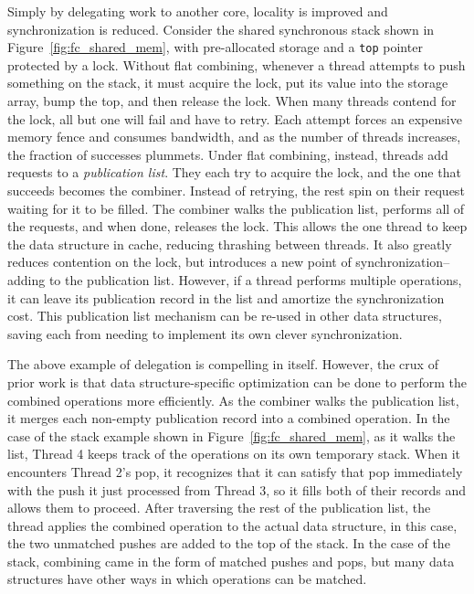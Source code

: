 

Simply by delegating work to another core, locality is improved and synchronization is reduced.
Consider the shared synchronous stack shown in Figure~\ref{fig:fc_shared_mem}, with pre-allocated storage and a \texttt{top} pointer protected by a lock. Without flat combining, whenever a thread attempts to push something on the stack, it must acquire the lock, put its value into the storage array, bump the top, and then release the lock. When many threads contend for the lock, all but one will fail and have to retry. Each attempt forces an expensive memory fence and consumes bandwidth, and as the number of threads increases, the fraction of successes plummets. Under flat combining, instead, threads add requests to a \emph{publication list}. They each try to acquire the lock, and the one that succeeds becomes the combiner. Instead of retrying, the rest spin on their request waiting for it to be filled. The combiner walks the publication list, performs all of the requests, and when done, releases the lock. This allows the one thread to keep the data structure in cache, reducing thrashing between threads. It also greatly reduces contention on the lock, but introduces a new point of synchronization--adding to the publication list. However, if a thread performs multiple operations, it can leave its publication record in the list and amortize the synchronization cost. This publication list mechanism can be re-used in other data structures, saving each from needing to implement its own clever synchronization.

The above example of delegation is compelling in itself. However, the crux of prior work is that data structure-specific optimization can be done to perform the combined operations more efficiently.
As the combiner walks the publication list, it merges each non-empty publication record into a combined operation. In the case of the stack example shown in Figure~\ref{fig:fc_shared_mem}, as it walks the list, Thread 4 keeps track of the operations on its own temporary stack. When it encounters Thread 2's pop, it recognizes that it can satisfy that pop immediately with the push it just processed from Thread 3, so it fills both of their records and allows them to proceed. After traversing the rest of the publication list, the thread applies the combined operation to the actual data structure, in this case, the two unmatched pushes are added to the top of the stack.
In the case of the stack, combining came in the form of matched pushes and pops, but many data structures have other ways in which operations can be matched.

